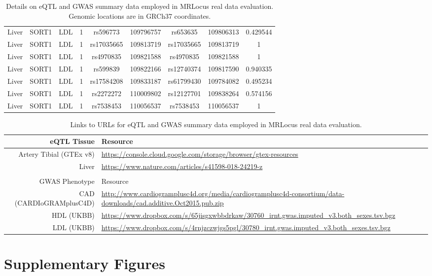 \documentclass[11pt]{article}
\begin{document}
\begin{table}[!ht]
\begin{tabular}{ccccccccc}
Liver & SORT1 & LDL & 1 & rs596773 & 109796757 & rs653635 & 109806313 & 0.429544 \\ 
Liver & SORT1 & LDL & 1 & rs17035665 & 109813719 & rs17035665 & 109813719 & 1 \\ 
Liver & SORT1 & LDL & 1 & rs4970835 & 109821588 & rs4970835 & 109821588 & 1 \\ 
Liver & SORT1 & LDL & 1 & rs599839 & 109822166 & rs12740374 & 109817590 & 0.940335 \\ 
Liver & SORT1 & LDL & 1 & rs17584208 & 109833187 & rs61799430 & 109784082 & 0.495234 \\ 
Liver & SORT1 & LDL & 1 & rs2272272 & 110009802 & rs12127701 & 109838264 & 0.574156 \\ 
Liver & SORT1 & LDL & 1 & rs7538453 & 110056537 & rs7538453 & 110056537 & 1 \\
\end{tabular}
\caption{Details on eQTL and GWAS summary data employed in MRLocus
  real data evaluation. Genomic locations are in GRCh37 coordinates.}
\end{table}

\begin{table}[!ht]
\centering
\footnotesize
\begin{tabular}{r p{4in}}
eQTL Tissue & Resource \\
\hline
Artery Tibial (GTEx v8) & \url{https://console.cloud.google.com/storage/browser/gtex-resources} \\
Liver & \url{https://www.nature.com/articles/s41598-018-24219-z} \\
& \\
GWAS Phenotype & Resource \\
\hline
CAD (CARDIoGRAMplusC4D) & \url{http://www.cardiogramplusc4d.org/media/cardiogramplusc4d-consortium/data-downloads/cad.additive.Oct2015.pub.zip} \\
HDL (UKBB) & \url{https://www.dropbox.com/s/65jisgxwbbdrkaw/30760_irnt.gwas.imputed_v3.both_sexes.tsv.bgz} \\
LDL (UKBB) & \url{https://www.dropbox.com/s/4rnjzczwjgs5pgl/30780_irnt.gwas.imputed_v3.both_sexes.tsv.bgz} \\
\end{tabular}
\caption{Links to URLs for eQTL and GWAS summary data employed in
  MRLocus real data evaluation.}
\end{table}


\clearpage

\section*{Supplementary Figures}
\end{document}
